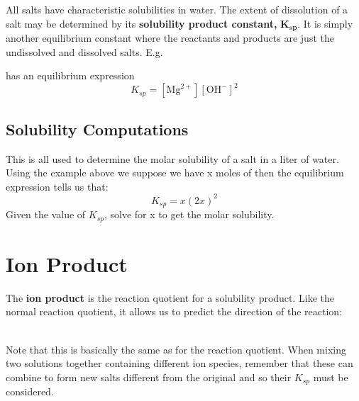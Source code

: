 \documentclass[../GChemReview.tex]{subfiles}
\begin{document}
		All salts have characteristic solubilities in water. The extent of dissolution of a salt may be determined by its \textbf{solubility product constant, }$ \boldsymbol{K_{sp}} $. It is simply another equilibrium constant where the reactants and products are just the undissolved and dissolved salts. E.g.
		\begin{center}
		\end{center}
		has an equilibrium expression
		\[ K_{sp} = [\text{Mg}^{2+}][\text{OH}^{-}]^{2} \]
		
		\subsection{Solubility Computations}
		
		This is all used to determine the molar solubility of a salt in a liter of water. Using the example above we suppose we have x moles of  then the equilibrium expression tells us that:
		\[ K_{sp} = x(2x)^{2} \]
		Given the value of $ K_{sp} $, solve for x to get the molar solubility.
		
		\section{Ion Product}
		
		The \textbf{ion product} is the reaction quotient for a solubility product. Like the normal reaction quotient, it allows us to predict the direction of the reaction:
		
		\centering
		\hfil \\
		\flushleft
		Note that this is basically the same as for the reaction quotient. When mixing two solutions together containing different ion species, remember that these can combine to form new salts different from the original and so their $ K_{sp} $ must be considered.
		
\end{document}
